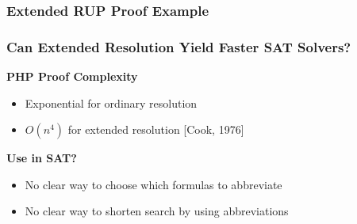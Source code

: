 \documentclass[t,pdf]{beamer}
\begin{document}
\begin{frame}
\frametitle{Extended RUP Proof Example}
\end{frame}

\begin{frame}
  \frametitle{Can Extended Resolution Yield Faster SAT Solvers?}
  
  {\bf PHP Proof Complexity}
  \begin{itemize}
  \item Exponential for ordinary resolution
  \item $O(n^4)$ for extended resolution [Cook, 1976]
  \end{itemize}

  {\bf Use in SAT?}
  \begin{itemize}
  \item No clear way to choose which formulas to abbreviate
  \item No clear way to shorten search by using abbreviations
  \end{itemize}

\end{frame}
\end{document}
